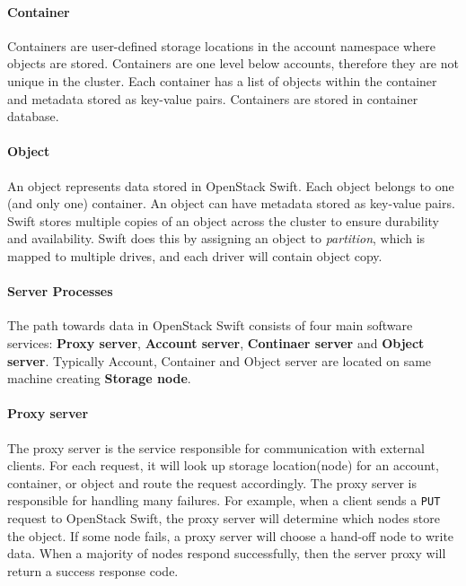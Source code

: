     \paragraph{Container}
    Containers are user-defined storage locations in the account namespace where objects are stored. Containers are one level below accounts, therefore they are not unique in the cluster. Each container has a list of objects within the container and metadata stored as key-value pairs. Containers are stored in container database\cite{swiftOpenStackSwift}.

    \paragraph{Object}
    An object represents data stored in OpenStack Swift. Each object belongs to one (and only one) container. An object can have metadata stored as key-value pairs. Swift stores multiple copies of an object across the cluster to ensure durability and availability. Swift does this by assigning an object to \textit{partition}, which is mapped to multiple drives, and each driver will contain object copy\cite{swiftOpenStackSwift}.

    \paragraph{Server Processes}
    The path towards data in OpenStack Swift consists of four main software services: \textbf{Proxy server}, \textbf{Account server}, \textbf{Continaer server} and \textbf{Object server}. Typically Account, Container and Object server are located on same machine creating \textbf{Storage node}.

    \paragraph{Proxy server}
    The proxy server is the service responsible for communication with external clients. For each request, it will look up storage location(node) for an account, container, or object and route the request accordingly\cite{SwiftArchitecturalOverview}. The proxy server is responsible for handling many failures. For example, when a client sends a \texttt{PUT} request to OpenStack Swift, the proxy server will determine which nodes store the object. If some node fails, a proxy server will choose a hand-off node to write data. When a majority of nodes respond successfully, then the server proxy will return a success response code\cite{swiftOpenStackSwift}.

